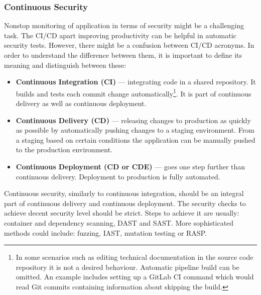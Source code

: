 \documentclass{article} %
\begin{document}
\subsubsection{Continuous Security}
Nonstop monitoring of application in terms of security might be a challenging task. The CI/CD apart improving productivity \cite{bib:cde_challenges, bib:cd_facebook, bib:ci_cd_all} can be helpful in automatic security tests. However, there might be a confusion between CI/CD acronyms. In order to understand the difference between them, it is important to define its meaning \cite{bib:ci_cd_all} and distinguish between these:
\begin{itemize}
    \item \textbf{Continuous Integration (CI)} --- integrating code in a shared repository. It builds and tests each commit change automatically\footnote{In some scenarios such as editing technical documentation in the source code repository it is not a desired behaviour. Automatic pipeline build can be omitted. An example includes setting up a GitLab CI command which would read Git commits containing information about skipping the build.}. It is part of continuous delivery as well as continuous deployment.
    \item \textbf{Continuous Delivery (CD)} --- releasing changes to production as quickly as possible by automatically pushing changes to a staging environment. From a staging based on certain conditions the application can be manually pushed to the production environment.
    \item \textbf{Continuous Deployment (CD or CDE)} --- goes one step further than continuous delivery. Deployment to production is fully automated.
\end{itemize}
Continuous security, similarly to continuous integration, should be an integral part of continuous delivery and continuous deployment. The security checks to achieve decent security level should be strict. Steps to achieve it are usually: container and dependency scanning, DAST and SAST. More sophisticated methods could include: fuzzing, IAST, mutation testing or RASP.\\
\end{document}
